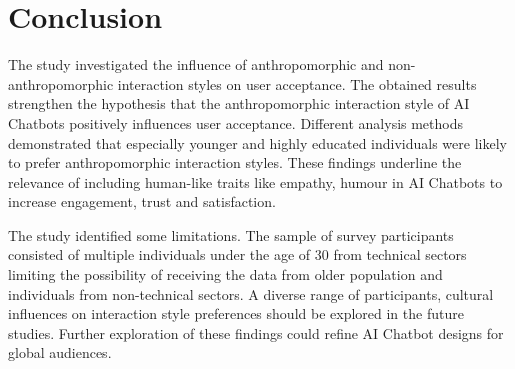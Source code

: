\documentclass[conference]{IEEEtran}
\begin{document}
\section{Conclusion}
The study investigated the influence of anthropomorphic and non-anthropomorphic interaction styles on user acceptance. The obtained results strengthen the hypothesis that the anthropomorphic interaction style of AI Chatbots positively influences user acceptance. Different analysis methods demonstrated that especially younger and highly educated individuals were likely to prefer anthropomorphic interaction styles. These findings underline the relevance of including human-like traits like empathy, humour in AI Chatbots to increase engagement, trust and satisfaction. \par
The study identified some limitations. The sample of survey participants consisted of multiple individuals under the age of 30 from technical sectors limiting the possibility of receiving the data from older population and individuals from non-technical sectors. A diverse range of participants, cultural influences on interaction style preferences should be explored in the future studies. Further exploration of these findings could refine AI Chatbot designs for global audiences.  
\end{document}
